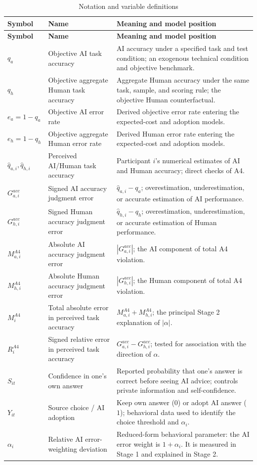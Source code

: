 \documentclass[11pt,a4paper]{article}
\begin{document}
\begin{longtable}{>{\RaggedRight\arraybackslash}p{}>{\RaggedRight\arraybackslash}p{}>{\RaggedRight\arraybackslash}p{}}
\caption{Notation and variable definitions}\label{tab:variables}\\
\toprule
\textbf{Symbol} & \textbf{Name} & \textbf{Meaning and model position}\\
\midrule
\endfirsthead
\toprule
\textbf{Symbol} & \textbf{Name} & \textbf{Meaning and model position}\\
\midrule
\endhead
$q_a$ & Objective AI task accuracy & AI accuracy under a specified task and test condition; an exogenous technical condition and objective benchmark.\\
$q_h$ & Objective aggregate Human task accuracy & Aggregate Human accuracy under the same task, sample, and scoring rule; the objective Human counterfactual.\\
$e_a=1-q_a$ & Objective AI error rate & Derived objective error rate entering the expected-cost and adoption models.\\
$e_h=1-q_h$ & Objective aggregate Human error rate & Derived Human error rate entering the expected-cost and adoption models.\\
$\widehat q_{a,i},\widehat q_{h,i}$ & Perceived AI/Human task accuracy & Participant $i$'s numerical estimates of AI and Human accuracy; direct checks of A4.\\
$G_{a,i}^{acc}$ & Signed AI accuracy judgment error & $\widehat q_{a,i}-q_a$; overestimation, underestimation, or accurate estimation of AI performance.\\
$G_{h,i}^{acc}$ & Signed Human accuracy judgment error & $\widehat q_{h,i}-q_h$; overestimation, underestimation, or accurate estimation of Human performance.\\
$M_{a,i}^{A4}$ & Absolute AI accuracy judgment error & $|G_{a,i}^{acc}|$; the AI component of total A4 violation.\\
$M_{h,i}^{A4}$ & Absolute Human accuracy judgment error & $|G_{h,i}^{acc}|$; the Human component of total A4 violation.\\
$M_i^{A4}$ & Total absolute error in perceived task accuracy & $M_{a,i}^{A4}+M_{h,i}^{A4}$; the principal Stage 2 explanation of $|\alpha|$.\\
$R_i^{A4}$ & Signed relative error in perceived task accuracy & $G_{a,i}^{acc}-G_{h,i}^{acc}$; tested for association with the direction of $\alpha$.\\
$S_{it}$ & Confidence in one's own answer & Reported probability that one's answer is correct before seeing AI advice; controls private information and self-confidence.\\
$Y_{it}$ & Source choice / AI adoption & Keep own answer ($0$) or adopt AI answer ($1$); behavioral data used to identify the choice threshold and $\alpha_i$.\\
$\alpha_i$ & Relative AI error-weighting deviation & Reduced-form behavioral parameter: the AI error weight is $1+\alpha_i$. It is measured in Stage 1 and explained in Stage 2.\\
\bottomrule
\end{longtable}
\end{document}
